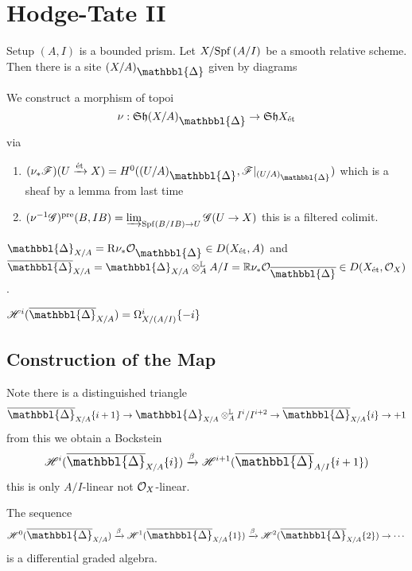 \documentclass[12pt]{article}
\newcommand{\Prism}{{\mathlarger{\mathbbl{\Delta}}}}
\begin{document}
\section{Hodge-Tate II}


Setup $(A, I)$ is a bounded prism. Let $X / \mathrm{Spf}\left( A/I \right)$ be a smooth relative scheme. Then there is a site $(X/A)_{\Prism}$ given by diagrams
\begin{center}
\end{center}

We construct a morphism of topoi
\[ \nu : \Sh{(X/A)_{\Prism}} \to \Sh{X_{\et}} \]
via
\begin{enumerate}
\item $(\nu_* \F)(U \xrightarrow{\et} X) = H^0((U/A)_{\Prism}, \F|_{(U/A)_{\Prism}})$ which is a sheaf by a lemma from last time
\item $(\nu^{-1} \mathscr{G})^{\text{pre}}(B, IB) = \operatorname*{\varinjlim}_{\mathrm{Spf}\left( B/IB \right) \to U} \mathscr{G}(U \to X)$ this is a filtered colimit.
\end{enumerate}

\begin{defn}
$\Prism_{X/A} = \R \nu_* \struct{\Prism} \in D(X_{\et}, A)$ and $\ol{\Prism}_{X/A} = \Prism_{X/A} \ot^{\LL}_A A/I = \RR \nu_* \struct{\ol{\Prism}} \in D(X_{\et}, \struct{X})$.
\end{defn}

\begin{theorem}
$\H^i(\ol{\Prism}_{X/A}) = \Omega^i_{X/(A/I)} \{ - i \}$
\end{theorem}

\subsection{Construction of the Map}

Note there is a distinguished triangle
\[ \ol{\Prism}_{X/A} \{ i + 1 \} \to \Prism_{X/A} \ot_A^{\LL} I^{i} / I^{i+2} \to \ol{\Prism}_{X/A} \{ i \} \to + 1 \]
from this we obtain a Bockstein
\[ \H^i(\ol{\Prism}_{X/A} \{ i \}) \xrightarrow{\beta} \H^{i+1}(\ol{\Prism}_{A/I} \{ i + 1\}) \]
this is only $A/I$-linear not $\mathcal{O}_{X}$-linear.

\begin{prop}
The sequence 
\[ \H^0(\ol{\Prism}_{X/A}) \xrightarrow{\beta} \H^1(\ol{\Prism}_{X/A} \{ 1 \}) \xrightarrow{\beta} \H^2(\ol{\Prism}_{X/A} \{ 2 \}) \to \cdots \]
is a differential graded algebra. 
\end{prop}
\end{document}
